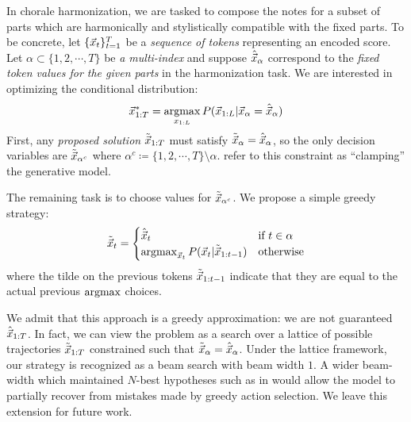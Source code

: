 In chorale harmonization, we are tasked to compose the notes for a subset of
parts which are harmonically and stylistically compatible with the fixed parts.
To be concrete, let $\{\vec{x}_{t}\}_{t=1}^T$ be a \emph{sequence of tokens}
representing an encoded score. Let $\alpha \subset \{1,2,\cdots,T\}$ be \emph{a
multi-index} and suppose $\hat{\vec{x}}_{\alpha}$ correspond to the \emph{fixed
token values for the given parts} in the harmonization task. We are interested
in optimizing the conditional distribution:
\begin{equation}
  \vec{x}_{1:T}^* = \operatorname*{argmax}_{x_{1:L}} P(\vec{x}_{1:L} | \vec{x}_{\alpha} = \hat{\vec{x}}_\alpha )
\end{equation}
First, any \emph{proposed solution} $\tilde{\vec{x}}_{1:T}$ must satisfy
$\tilde{\vec{x}}_{\alpha} = \hat{\vec{x}}_\alpha$, so the only decision variables are
$\tilde{\vec{x}}_{\alpha^c}$ where $\alpha^c \coloneqq \{1,2,\cdots,T\} \setminus
\alpha$. \citet{hinton1986learning} refer to this constraint as ``clamping''
the generative model.

The remaining task is to choose values for $\tilde{\vec{x}}_{\alpha^c}$.
We propose a simple greedy strategy:
\begin{equation}\label{eq:greedy-harmonization}
  \tilde{\vec{x}}_{t} = \begin{cases}
    \hat{\vec{x}}_{t} &\text{if}~t \in \alpha \\
    \operatorname*{argmax}_{\vec{x}_t} P(\vec{x}_t | \tilde{\vec{x}}_{1:t-1}) &\text{otherwise}
  \end{cases}
\end{equation}
where the tilde on the previous tokens $\tilde{\vec{x}}_{1:t-1}$ indicate that they are
equal to the actual previous $\operatorname*{argmax}$ choices.

We admit that this approach is a greedy approximation: we are not guaranteed
$\hat{\vec{x}}_{1:T}$. In fact, we can view the problem as a search over a lattice
of possible trajectories $\tilde{\vec{x}}_{1:T}$ constrained such that
$\tilde{\vec{x}}_{\alpha} = \hat{\vec{x}}_\alpha$. Under the lattice framework, our
strategy is recognized as a beam search with beam width $1$. A wider beam-width
which maintained $N$-best hypotheses such as in \citet{liu2014efficient} would
allow the model to partially recover from mistakes made by greedy action
selection. We leave this extension for future work.

